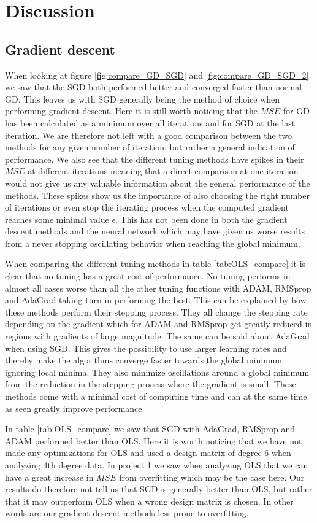 \documentclass[11pt]{article}
\begin{document}
\section{Discussion}
\subsection{Gradient descent}
When looking at figure \ref{fig:compare_GD_SGD} and \ref{fig:compare_GD_SGD_2} we saw that the SGD both performed better and converged faster than normal GD. This leaves us with SGD generally being the method of choice when performing gradient descent. Here it is still worth noticing that the $MSE$ for GD has been calculated as a minimum over all iterations and for SGD at the last iteration. We are therefore not left with a good comparison between the two methods for any given number of iteration, but rather a general indication of performance.
We also see that the different tuning methods have spikes in their $MSE$ at different iterations meaning that a direct comparison at one iteration would not give us any valuable information about the general performance of the methods. These spikes show us the importance of also choosing the right number of iterations or even stop the iterating process when the computed gradient reaches some minimal value $\epsilon$. This has not been done in both the gradient descent methods and the neural network which may have given us worse results from a never stopping oscillating behavior when reaching the global minimum.

When comparing the different tuning methods in table \ref{tab:OLS_compare} it is clear that no tuning has a great cost of performance. No tuning performs in almost all cases worse than all the other tuning functions with ADAM, RMSprop and AdaGrad taking turn in performing the best. This can be explained by how these methods perform their stepping process. They all change the stepping rate depending on the gradient which for ADAM and RMSprop get greatly reduced in regions with gradients of large magnitude. The same can be said about AdaGrad when using SGD. This gives the possibility to use larger learning rates and thereby make the algorithms converge faster towards the global minimum ignoring local minima. They also minimize oscillations around a global minimum from the reduction in the stepping process where the gradient is small.  These methods come with a minimal cost of computing time and can at the same time as seen greatly improve performance.

In table \ref{tab:OLS_compare} we saw that SGD with AdaGrad, RMSprop and ADAM performed better than OLS. Here it is worth noticing that we have not made any optimizations for OLS and used a design matrix of degree 6 when analyzing 4th degree data. In project 1 \cite{project1} we saw when analyzing OLS that we can have a great increase in $MSE$ from overfitting which may be the case here. Our results do therefore not tell us that SGD is generally better than OLS, but rather that it may outperform OLS when a wrong design matrix is chosen. In other words are our gradient descent methods less prone to overfitting.
\end{document}
